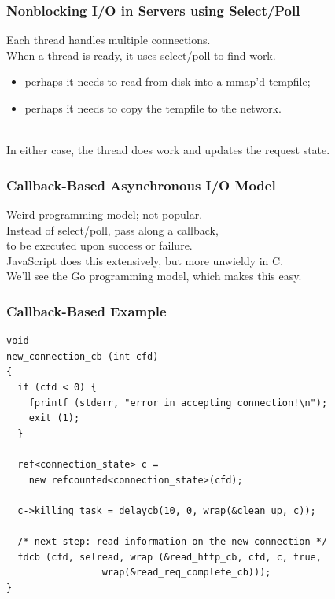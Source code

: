 \begin{frame}
  \frametitle{Nonblocking I/O in Servers using Select/Poll}

  
    Each thread handles multiple connections.\\[1em]

    When a thread is ready, it uses select/poll to find work.\\

    \begin{itemize}
      \item perhaps it needs to read from disk into a mmap'd tempfile;
      \item perhaps it needs to copy the tempfile to the network.
    \end{itemize}~\\
    In either case, the thread does work and updates the request state.
  
\end{frame}

\begin{frame}
  \frametitle{Callback-Based Asynchronous I/O Model}

  
    Weird programming model; not popular.\\[1em]
    Instead of select/poll, pass along a callback,\\ to be executed upon success or failure.\\[1em]
    JavaScript does this extensively, but more unwieldy in C.\\[1em]
    We'll see the Go programming model, which makes this easy.
  
\end{frame}

\begin{frame}[fragile]
  \frametitle{Callback-Based Example}

\begin{lstlisting}
void
new_connection_cb (int cfd)
{
  if (cfd < 0) {
    fprintf (stderr, "error in accepting connection!\n");
    exit (1);
  }

  ref<connection_state> c = 
    new refcounted<connection_state>(cfd);

  c->killing_task = delaycb(10, 0, wrap(&clean_up, c));

  /* next step: read information on the new connection */
  fdcb (cfd, selread, wrap (&read_http_cb, cfd, c, true,
                 wrap(&read_req_complete_cb)));
}
\end{lstlisting}

\end{frame}

